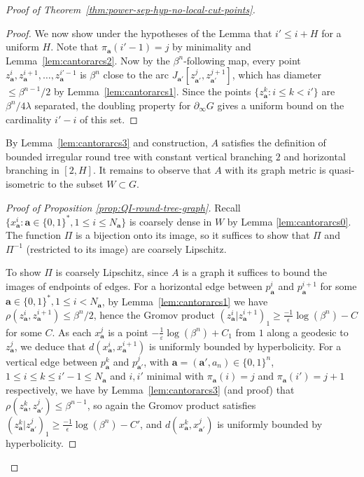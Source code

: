 \documentclass[11pt]{amsart}
\numberwithin{equation}{section}
\theoremstyle{citing}
\newcommand{\bdry}{\partial_\infty}
\newcommand{\ba}{\mathbf{a}}
\numberwithin{equation}{section}
\begin{document}
\begin{proof}[Proof of Theorem~\ref{thm:power-sep-hyp-no-local-cut-points}]
\begin{proof}
		We now show under the hypotheses of the Lemma that $i' \leq i+H$ for a uniform $H$.
		Note that $\pi_\ba(i'-1)=j$ by minimality and Lemma~\ref{lem:cantorarcs2}.
		Now by the $\beta^n$-following map, every point $z_\ba^i, z_\ba^{i+1},\ldots, z_\ba^{i'-1}$ is $\beta^n$ close to the arc $J_{\ba'}[z_{\ba'}^j, z_{\ba'}^{j+1}]$, which has diameter $\leq \beta^{n-1}/2$ by Lemma~\ref{lem:cantorarcs1}.
		Since the points $\{z_\ba^k : i \leq k < i'\}$ are $\beta^n/4\lambda$ separated, the doubling property for $\bdry G$ gives a uniform bound on the cardinality $i'-i$ of this set.
	\end{proof}

		By Lemma~\ref{lem:cantorarcs3} and construction, $A$ satisfies the definition of bounded irregular round tree with constant vertical branching $2$ and horizontal branching in $[2,H]$.  It remains to observe that $A$ with its graph metric is quasi-isometric to the subset $W \subset G$.
	
		\begin{proof}[Proof of Proposition \ref{prop:QI-round-tree-graph}]
		Recall $\{x_\ba^i : \ba \in \{0,1\}^*, 1 \leq i \leq N_\ba\}$ is coarsely dense in $W$ by Lemma \ref{lem:cantorarcs0}.
		The function $\Pi$ is a bijection onto its image, so it suffices to show that $\Pi$ and $\Pi^{-1}$ (restricted to its image) are coarsely Lipschitz.

		To show $\Pi$ is coarsely Lipschitz, since $A$ is a graph it suffices to bound the images of endpoints of edges.
		For a horizontal edge between $p_\ba^i$ and $p_\ba^{i+1}$ for some $\ba \in \{0,1\}^*, 1 \leq i < N_\ba$, by Lemma~\ref{lem:cantorarcs1} we have $\rho(z_\ba^i, z_\ba^{i+1}) \leq \beta^n/2$, hence the Gromov product $(z_\ba^i | z_\ba^{i+1})_1 \geq \frac{-1}{\epsilon}\log(\beta^n)-C$ for some $C$.  As each $x^j_\ba$ is a point $-\frac1\varepsilon\log(\beta^n)+C_1$ from $1$ along a geodesic to $z^j_\ba$, we deduce that $d(x_\ba^i, x_\ba^{i+1})$ is uniformly bounded by hyperbolicity.
		For a vertical edge between $p_\ba^k$ and $p_{\ba'}^j$, with $\ba=(\ba',a_n) \in \{0,1\}^n$, $1 \leq i\leq k \leq i'-1 \leq N_\ba$ and $i,i'$ minimal with $\pi_\ba(i)=j$ and $\pi_\ba(i')=j+1$ respectively, we have by Lemma~\ref{lem:cantorarcs3} (and proof) that $\rho(z_\ba^k, z_{\ba'}^j) \leq \beta^{n-1}$, so again the Gromov product satisfies $(z_\ba^k| z_{\ba'}^j)_1 \geq \frac{-1}{\epsilon}\log(\beta^n)-C'$, and $d(x_\ba^k, x_{\ba'}^j)$ is uniformly bounded by hyperbolicity.



\end{proof}
\end{proof}
\end{document}
